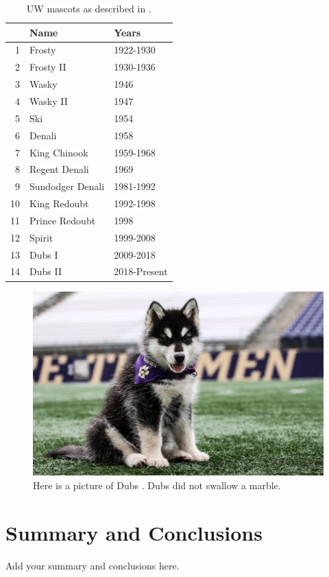 \documentclass{article}
\begin{document}
\begin{table}
    \centering
    \begin{tabular}{rll}
    & Name & Years \\
    \hline
    1 & Frosty & 1922-1930  \\
    2 & Frosty II & 1930-1936 \\
    3 & Wasky & 1946 \\
    4 & Wasky II & 1947 \\
    5 & Ski & 1954 \\
    6 & Denali & 1958 \\
    7 & King Chinook & 1959-1968\\
    8 & Regent Denali & 1969 \\
    9 & Sundodger Denali & 1981-1992 \\
    10 & King Redoubt & 1992-1998 \\
    11 & Prince Redoubt & 1998 \\
    12 & Spirit & 1999-2008 \\
    13 & Dubs I & 2009-2018 \\
    14 & Dubs II & 2018-Present
    \end{tabular}
    \caption{UW mascots as described in \cite{washington_huskies}.}
    \label{tab:mascots}
\end{table}

\begin{figure}
    \centering
    \includegraphics[width=0.5\linewidth]{dubs.jpg}
    \caption{Here is a picture of Dubs \cite{webeck_2018}. Dubs did not swallow a marble.}
    \label{fig:dubs}
\end{figure}

\section{Summary and Conclusions}
Add your summary and conclusions here.

\printbibliography
\end{document}

